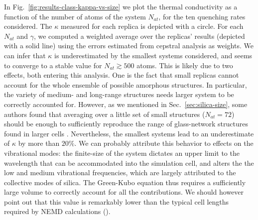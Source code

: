 In Fig.~\ref{fig:results-class-kappa-vs-size} we plot the thermal conductivity as a function of the number of atoms of the system $N_{at}$, for the ten quenching rates considered. 
The $\kappa$ measured for each replica is depicted with a circle. 
For each $N_{at}$ and $\gamma$, we computed a weighted average over the replicas' results (depicted with a solid line) using the errors estimated from cepstral analysis as weights. 
We can infer that $\kappa$ is underestimated by the smallest systems considered, and seems to converge to a stable value for $N_{at}\gtrsim 500$ atoms. 
This is likely due to two effects, both entering this analysis. 
One is the fact that small replicas cannot account for the whole ensemble of possible amorphous structures. In particular, the variety of medium- and long-range structures needs larger system to be correctly accounted for. However, as we mentioned in Sec.~\ref{sec:silica-size}, some authors found that averaging over a little set of small structures ($N_{at}=72$) should be enough to sufficiently reproduce the range of glass-network structures found in larger cells \cite{VanGinhoven2005}. 
Nevertheless, the smallest systems lead to an underestimate of $\kappa$ by more than $20\%$. We can probably attribute this behavior to effects on the vibrational modes: the finite-size of the system dictates an upper limit to the wavelength that can be accommodated into the simulation cell, and alters the the low and medium vibrational frequencies, which are largely attributed to the collective modes of silica. The Green-Kubo equation thus requires a sufficiently large volume to correctly account for all the contributions. 
We should however point out that this value is remarkably lower than the typical cell lengths required by NEMD calculations ().

